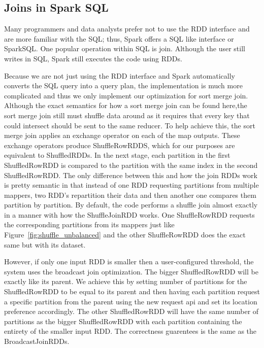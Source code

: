 \subsection{Joins in Spark SQL}

Many programmers and data analysts prefer not to use the RDD interface
and are more familiar with the SQL; thus, Spark offers a SQL like interface or SparkSQL. One popular operation within SQL is join.
Although the user still writes in SQL, Spark still executes the code using RDDs.

Because we are not just using the RDD interface and Spark automatically converts the SQL query into a query plan,
the implementation is much more complicated and thus we only implement our optimization for sort merge join.
Although the exact semantics for how a sort merge join can be found here,the sort merge join still must shuffle data around as it requires that every
key that could intersect should be sent to the same reducer.
To help achieve this, the sort merge join applies an exchange operator on each of the map outputs. These exchange operators produce
ShuffleRowRDDS, which for our purposes are equivalent to ShuffledRDDs. In the next stage, each partition in the first ShuffledRowRDD is compared
to the partition with the same index in the second ShuffledRowRDD. The only difference between this and how the join RDDs work is pretty semantic
in  that instead of one RDD requesting partitions from multiple mappers, two RDD's repartition their data and then another one compares them partition by partition.
By default, the code performs a shuffle join almost exactly in a manner with how the ShuffleJoinRDD works. One ShuffleRowRDD requests 
the corresponding partitions from its mappers just like Figure~\ref{fig:shuffle_unbalanced} and the other ShuffleRowRDD does the exact same but with its dataset.  

However, if only one input RDD is smaller then a user-configured threshold, the system uses the broadcast join optimization. The bigger ShuffledRowRDD will be exactly like its
parent. We achieve this by setting number of partitions for the ShuffledRowRDD to be equal to its parent and then having each partition request a specific partition from the parent using the new request api and set its location preference accordingly. The other ShuffledRowRDD will have the same number of partitions as the bigger ShuffledRowRDD with each partition containing the entirety of the smaller input RDD. 
The correctness guarentees is the same as the BroadcastJoinRDDs.  

